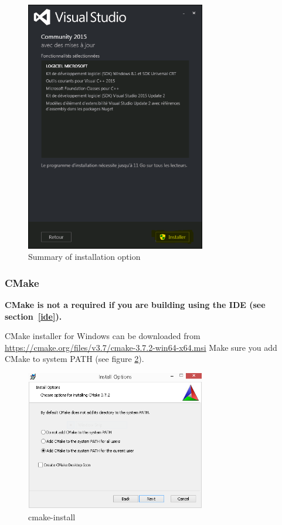 \documentclass[10pt,a4paper]{article}
\begin{document}
\begin{figure}[!htbp]
  \center
  \includegraphics[width=0.7\textwidth]{Art/vs2015-start-install.png}
  \caption[]{Summary of installation option}
  \label{fig:vs2015-start-install}
\end{figure}

\subsubsection{CMake}

\textbf{CMake is not a required if you are building using the IDE (see section~\ref{ide}).}

CMake installer for Windows can be downloaded from \url{https://cmake.org/files/v3.7/cmake-3.7.2-win64-x64.msi}
\newline
Make sure you add CMake to system PATH (see figure \ref{fig:cmake-install}).

\begin{figure}[!htbp]
  \center
  \includegraphics[width=0.7\textwidth]{Art/cmake-install.png}
  \caption[]{cmake-install}
  \label{fig:cmake-install}
\end{figure}
\end{document}
